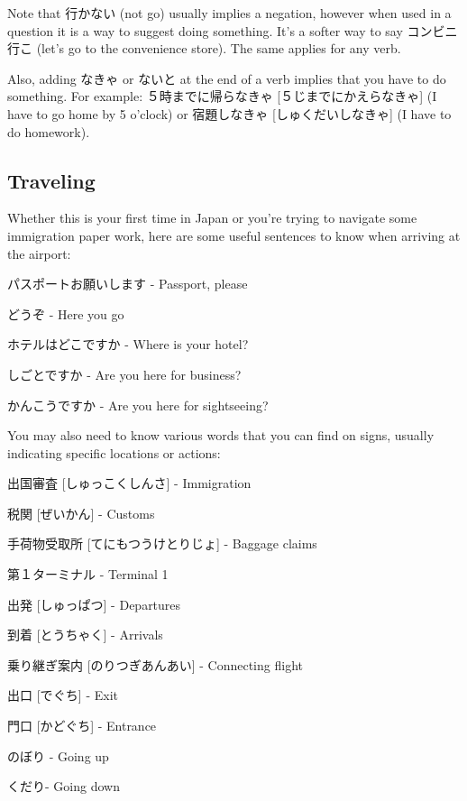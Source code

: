 \documentclass{article}
\begin{document}
\begin{CJK}{UTF8}{min}
\begin{multicols*}{3}
Note that 行かない (not go) usually implies a negation, however when used in a question it is a way to suggest doing something. It's a softer way to say コンビニ行こ (let's go to 
the convenience store). The same applies for any verb.

Also, adding なきゃ or ないと at the end of a verb implies that you have to do something. For example: ５時までに帰らなきゃ [５じまでにかえらなきゃ] (I have to go home by 5 o'clock) 
or 宿題しなきゃ [しゅくだいしなきゃ] (I have to do homework).

\subsection{Traveling}

Whether this is your first time in Japan or you're trying to navigate some immigration paper work, here are some useful sentences to know when arriving at the airport:

\begin{colorize}
\item パスポートお願いします - Passport, please
\item どうぞ - Here you go
\item ホテルはどこですか - Where is your hotel?
\item しごとですか - Are you here for business?
\item かんこうですか - Are you here for sightseeing?
\end{colorize}

You may also need to know various words that you can find on signs, usually indicating specific locations or actions:

\begin{colorize}
\item 出国審査 [しゅっこくしんさ] - Immigration
\item 税関 [ぜいかん] - Customs
\item 手荷物受取所 [てにもつうけとりじょ] - Baggage claims
\item 第１ターミナル - Terminal 1
\item 出発 [しゅっぱつ] - Departures
\item 到着 [とうちゃく] - Arrivals
\item 乗り継ぎ案内 [のりつぎあんあい] - Connecting flight
\item 出口 [でぐち] - Exit
\item 門口 [かどぐち] - Entrance
\item のぼり - Going up
\item くだり- Going down
\end{colorize}


\end{multicols*}
\end{CJK}
\end{document}
